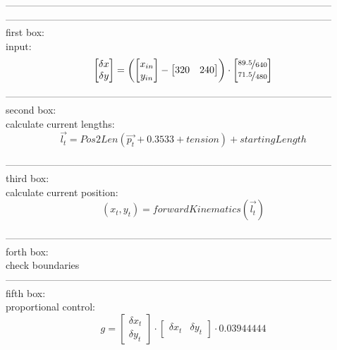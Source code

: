 \documentclass{article}
\begin{document}
---------------------------------------------------------------------------------------------------\\
---------------------------------------------------------------------------------------------------\\
first box:\\

input:\\
\[
\begin{bmatrix}
\delta{x}\\
\delta{y}
\end{bmatrix}
=
\left(
\begin{bmatrix}
x_{in}\\
y_{in}
\end{bmatrix}
-
\begin{bmatrix}
320 & 240
\end{bmatrix}
\right)
\cdot
\begin{bmatrix}
\nicefrac{89.5}{640}\\
\nicefrac{71.5}{480}
\end{bmatrix}
\]
 	---------------------------------------------------------------------------------------------------\\
 	
second box:\\
calculate current lengths:\\

	\[
	\vec{l_t} = Pos2Len
	\left(
	\vec{p_t} + 0.3533 + tension
	\right) + startingLength
	\]
 		
 		  	---------------------------------------------------------------------------------------------------\\
 		  	
third box:\\
calculate current position:\\
\[
(x_t,y_t) = forwardKinematics 
\left(
\vec{l_t}
\right)
\]

---------------------------------------------------------------------------------------------------\\
forth box:\\
check boundaries\\
---------------------------------------------------------------------------------------------------\\
fifth box:\\
proportional control:\\
 \[
 g = 
 \begin{bmatrix}
 \delta{x_t}\\
 \delta{y_t}
 \end{bmatrix}
 \cdot
 \begin{bmatrix}
 \delta{x_t} & \delta{y_t}
 \end{bmatrix}
 \cdot 
 0.03944444
 \]
\end{document}
